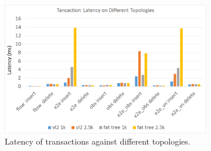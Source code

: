 \label{sec:eval}



\begin{figure}[ht!]
        \centering
        \begin{subfigure}[b]{.4\linewidth}
          \centering
          \includegraphics[width=1\textwidth]{transaction_latency.png}
  \caption{Latency of transactions against different topologies.}
  \label{fig:latency-all}
        \end{subfigure}
        \hfill
        \begin{subfigure}[b]{.232\linewidth}
  \centering

\end{subfigure}
\end{figure}
